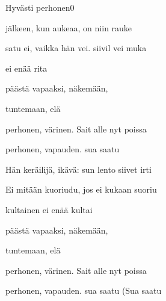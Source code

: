 \documentclass[11pt,a4paper]{article}
\begin{document}
\thispagestyle{empty}
\begin{mysong}{Hyvästi perhonen}{0}

\begin{SBVerse}
   jälkeen, kun  aukeaa, on  niin
   rauke

   satu ei, vaikka  hän vei. 
  siivil vei muka

    ei  enää
   rita

   päästä vapaaksi,  näkemään,

   tuntemaan,  elä
\end{SBVerse}

\begin{SBChorus}
   perhonen,  värinen. Sait  alle
   nyt poissa 

   perhonen,  vapauden.
   sua saatu 
\end{SBChorus}


\begin{SBVerse}
  Hän  keräilijä,  ikävä:  sun lento
   siivet irti 

  Ei  mitään  kuoriudu, jos ei 
  kukaan  suoriu

    kultainen ei  enää
   kultai

   päästä vapaaksi,  näkemään,

   tuntemaan,  elä
\end{SBVerse}

\begin{SBChorus}
   perhonen,  värinen. Sait  alle
   nyt poissa 

   perhonen,  vapauden.
   sua saatu  (Sua saatu
\end{SBChorus}


\end{mysong}
\end{document}
